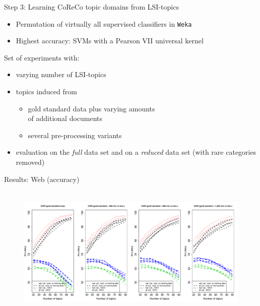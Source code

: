 \documentclass{beamer}
\begin{document}
\begin{frame}
  {Step 3: Learning CoReCo topic domains from LSI-topics}
  \begin{itemize}
    \item Permutation of virtually all supervised classifiers in \texttt{Weka}\\ \citep{HallWitten2011}
    \item Highest accuracy: SVMs with a Pearson VII universal kernel\\ \citep{UstunEa2006}
  \end{itemize}
  \vspace{.5cm}
\pause
Set of experiments with:
  \begin{itemize}
    \item varying number of LSI-topics
    \item topics induced from
      \begin{itemize} 
        \item gold standard data plus varying amounts\\
	  of additional documents
        \item several pre-processing variants
      \end{itemize}
    \item evaluation on the \textit{full} data set and on a \textit{reduced} data set (with rare categories removed)
  \end{itemize}
\end{frame}


\begin{frame}
  {Results: Web (accuracy)}
  \begin{figure}
    \centering
    \includegraphics[width=\textwidth, height=6.4cm]{graphics/acc_cow.pdf}
  \end{figure}
  \vspace{-.3cm}
  \centering
\end{frame}
\end{document}
